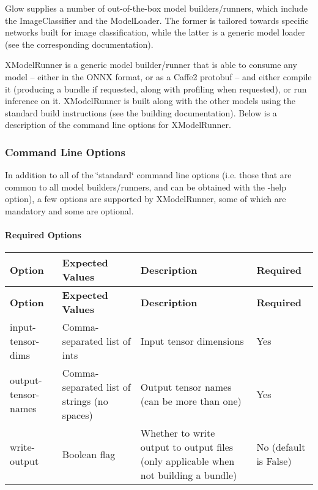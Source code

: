 Glow supplies a number of out-\/of-\/the-\/box model builders/runners, which include the {\ttfamily Image\+Classifier} and the {\ttfamily Model\+Loader}. The former is tailored towards specific networks built for image classification, while the latter is a generic model loader (see the corresponding documentation).

{\ttfamily X\+Model\+Runner} is a generic model builder/runner that is able to consume any model -- either in the O\+N\+NX format, or as a Caffe2 protobuf -- and either compile it (producing a bundle if requested, along with profiling when requested), or run inference on it. {\ttfamily X\+Model\+Runner} is built along with the other models using the standard build instructions (see the building documentation). Below is a description of the command line options for {\ttfamily X\+Model\+Runner}.

\subsubsection*{Command Line Options}

In addition to all of the \char`\"{}standard\char`\"{} command line options (i.\+e. those that are common to all model builders/runners, and can be obtained with the {\ttfamily -\/help} option), a few options are supported by {\ttfamily X\+Model\+Runner}, some of which are mandatory and some are optional.

\paragraph*{Required Options}

\tabulinesep=1mm
\begin{longtabu} spread 0pt [c]{*{4}{|X[-1]}|}
\hline
\rowcolor{\tableheadbgcolor}\textbf{ Option }&\textbf{ Expected Values }&\textbf{ Description }&\textbf{ Required  }\\
\endfirsthead
\hline
\endfoot
\hline
\rowcolor{\tableheadbgcolor}\textbf{ Option }&\textbf{ Expected Values }&\textbf{ Description }&\textbf{ Required  }\\
\endhead
{\ttfamily input-\/tensor-\/dims} &Comma-\/separated list of ints &Input tensor dimensions &Yes \\
{\ttfamily output-\/tensor-\/names} &Comma-\/separated list of strings (no spaces) &Output tensor names (can be more than one) &Yes \\
{\ttfamily write-\/output} &Boolean flag &Whether to write output to output files (only applicable when not building a bundle) &No (default is {\ttfamily False}) \\
\end{longtabu}
